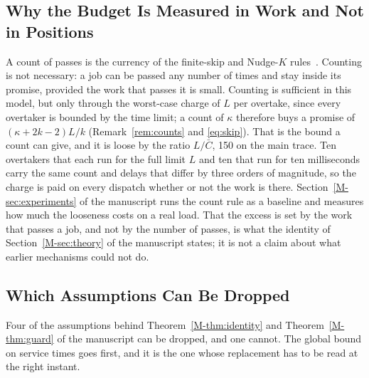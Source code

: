 \documentclass[mathematics,supfile,submit,moreauthors]{Definitions/mdpi}
\newcommand{\devnum}[1]{#1}
\begin{document}

\subsection{Why the Budget Is Measured in Work and Not in Positions}
\label{sec:supp_workpositions}

A count of passes is the currency of the finite-skip and Nudge-$K$
rules~\cite{grosof2021nudge,vanhoudt2022nudgek,grosof2022wcfs}. Counting is not
necessary: a job can be passed any number of times and stay inside its promise, provided
the work that passes it is small. Counting is sufficient in this model, but only through
the worst-case charge of $L$ per overtake, since every overtaker is bounded by the time
limit; a count of $\kappa$ therefore buys a promise of $(\kappa + 2k-2)L/k$
(Remark~\ref{rem:counts} and \eqref{eq:skip}). That is the bound a count can give, and it
is loose by the ratio $L/\bar{C}$, \devnum{150} on the main trace. Ten
overtakers that each run for the full limit $L$ and ten that run for ten milliseconds
carry the same count and delays that differ by three orders of magnitude, so the charge
is paid on every dispatch whether or not the work is there.
Section~\ref*{M-sec:experiments} of the manuscript runs the count rule as a baseline and measures how much
the looseness costs on a real load. That the excess is set by the work that passes a
job, and not by the number of passes, is what the identity of
Section~\ref*{M-sec:theory} of the manuscript states; it is not a claim about what
earlier mechanisms could not do.

\subsection{Which Assumptions Can Be Dropped}
\label{sec:supp_relaxations}

Four of the assumptions behind Theorem~\ref*{M-thm:identity} and Theorem~\ref*{M-thm:guard} of the manuscript can be
dropped, and one cannot. The global bound on service times goes first, and it is the
one whose replacement has to be read at the right instant.
\end{document}
